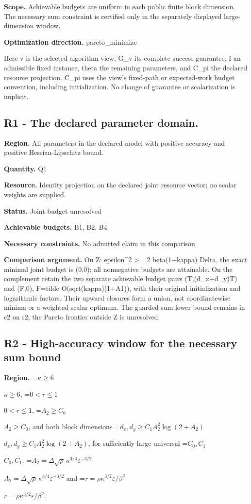 \documentclass[10pt,a4paper]{article}
\newcommand{\AtlasMath}[1]{\par\begingroup\centering\setbox0=\hbox{$\displaystyle #1$}\ifdim\wd0>1.4\linewidth\typeout{ATLAS WIDE FORMULA: \the\wd0}\fi\ifdim\wd0>\linewidth\resizebox{\linewidth}{!}{\box0}\else\box0\fi\par\endgroup}
\newcommand{\AtlasInlineMath}[1]{\begingroup\setbox0=\hbox{$#1$}\ifdim\wd0>.4\linewidth\endgroup\AtlasMath{#1}\else\endgroup$#1$\fi}
\begin{document}
\textbf{Scope.} Achievable budgets are uniform in each public finite block dimension. The necessary sum constraint is certified only in the separately displayed large-dimension window.

\textbf{Optimization direction.} pareto\_\allowbreak{}minimize

Here v is the selected algorithm view, G\_\allowbreak{}v its complete success guarantee, I an admissible fixed instance, theta the remaining parameters, and C\_\allowbreak{}pi the declared resource projection. C\_\allowbreak{}pi uses the view's fixed-path or expected-work budget convention, including initialization. No change of guarantee or scalarization is implicit.

\subsection{R1 - The declared parameter domain.}
\textbf{Region.} All parameters in the declared model with positive accuracy and positive Hessian-Lipschitz bound.

\textbf{Quantity.} Q1

\textbf{Resource.} Identity projection on the declared joint resource vector; no scalar weights are supplied.

\textbf{Status.} Joint budget unresolved

\textbf{Achievable budgets.} B1, B2, B4

\textbf{Necessary constraints.} No admitted claim in this comparison

\textbf{Comparison argument.} On Z: epsilon\textasciicircum{}2 >= 2 beta(1+kappa) Delta, the exact minimal joint budget is (0,0); all nonnegative budgets are attainable. On the complement retain the two separate achievable budget pairs (T,(d\_\allowbreak{}x+d\_\allowbreak{}y)T) and (F,0), F=tilde O(sqrt(kappa)(1+A1)), with their original initialization and logarithmic factors. Their upward closures form a union, not coordinatewise minima or a weighted scalar optimum. The guarded sum lower bound remains in c2 on r2; the Pareto frontier outside Z is unresolved.

\subsection{R2 - High-accuracy window for the necessary sum bound}
\textbf{Region.} \AtlasInlineMath{\kappa\ge6}, \AtlasInlineMath{0<r\le1}, \AtlasInlineMath{A_2\ge C_0}, and both block dimensions \AtlasInlineMath{d_x,d_y\ge C_1 A_2^2\log(2+A_2)}, for sufficiently large universal \AtlasInlineMath{C_0,C_1}. \AtlasInlineMath{A_2=\Delta\sqrt\rho\,\kappa^{3/4}\varepsilon^{-3/2}} and \AtlasInlineMath{r=\rho\kappa^{3/2}\varepsilon/\beta^2}.
\end{document}
